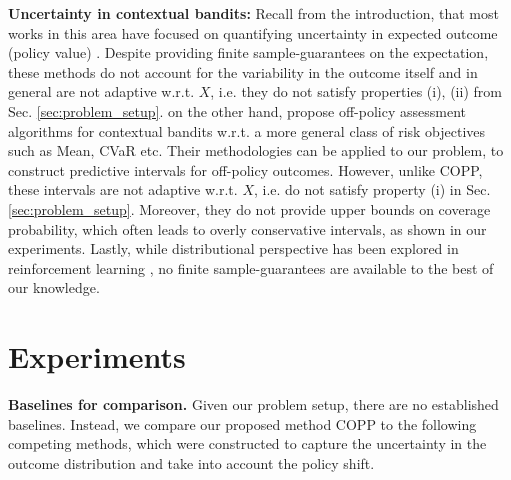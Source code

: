 \textbf{Uncertainty in contextual bandits:} Recall from the introduction, that most works in this area have focused on quantifying uncertainty in expected outcome (policy value) \citep{doubly-robust, uncertainty5}. Despite providing finite sample-guarantees on the expectation, these methods do not account for the variability in the outcome itself and in general are not adaptive w.r.t. $X$, i.e. they do not satisfy properties (i), (ii) from Sec. \ref{sec:problem_setup}. \cite{risk-assessment, chandak2021universal} on the other hand, propose off-policy assessment algorithms for contextual bandits w.r.t. a more general class of risk objectives such as Mean, CVaR etc. Their methodologies can be applied to our problem, to construct predictive intervals for off-policy outcomes. However, unlike COPP, these intervals are not adaptive w.r.t. $X$, i.e. do not satisfy property (i) in Sec. \ref{sec:problem_setup}. Moreover, they do not provide upper bounds on coverage probability, which often leads to overly conservative intervals, as shown in our experiments. Lastly, while distributional perspective has been explored in reinforcement learning \citep{distributional-rl}, no finite sample-guarantees are available to the best of our knowledge.


\section{Experiments} \label{sec:exp}



\textbf{Baselines for comparison.}
Given our problem setup, there are no established baselines. Instead, we compare our proposed method COPP to the following competing methods, which were constructed to capture the uncertainty in the outcome distribution and take into account the policy shift. 

